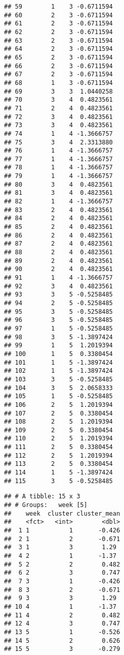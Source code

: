 \documentclass[]{article}
\newenvironment{Shaded}{\begin{snugshade}}{\end{snugshade}}
\newcommand{\DataTypeTok}[1]{\textcolor[rgb]{0.13,0.29,0.53}{#1}}
\newcommand{\KeywordTok}[1]{\textcolor[rgb]{0.13,0.29,0.53}{\textbf{#1}}}
\newcommand{\NormalTok}[1]{#1}
\newcommand{\OperatorTok}[1]{\textcolor[rgb]{0.81,0.36,0.00}{\textbf{#1}}}
\newcommand{\StringTok}[1]{\textcolor[rgb]{0.31,0.60,0.02}{#1}}
\begin{document}
\begin{verbatim}
## 59        1    3 -0.6711594
## 60        2    3 -0.6711594
## 61        2    3 -0.6711594
## 62        2    3 -0.6711594
## 63        2    3 -0.6711594
## 64        2    3 -0.6711594
## 65        2    3 -0.6711594
## 66        2    3 -0.6711594
## 67        2    3 -0.6711594
## 68        1    3 -0.6711594
## 69        3    3  1.0440258
## 70        3    4  0.4823561
## 71        2    4  0.4823561
## 72        3    4  0.4823561
## 73        3    4  0.4823561
## 74        1    4 -1.3666757
## 75        3    4  2.3313880
## 76        1    4 -1.3666757
## 77        1    4 -1.3666757
## 78        1    4 -1.3666757
## 79        1    4 -1.3666757
## 80        3    4  0.4823561
## 81        3    4  0.4823561
## 82        1    4 -1.3666757
## 83        2    4  0.4823561
## 84        2    4  0.4823561
## 85        2    4  0.4823561
## 86        2    4  0.4823561
## 87        2    4  0.4823561
## 88        2    4  0.4823561
## 89        2    4  0.4823561
## 90        2    4  0.4823561
## 91        1    4 -1.3666757
## 92        3    4  0.4823561
## 93        3    5 -0.5258485
## 94        2    5 -0.5258485
## 95        3    5 -0.5258485
## 96        3    5 -0.5258485
## 97        1    5 -0.5258485
## 98        3    5 -1.3897424
## 99        1    5  1.2019394
## 100       1    5  0.3380454
## 101       1    5 -1.3897424
## 102       1    5 -1.3897424
## 103       3    5 -0.5258485
## 104       3    5  2.0658333
## 105       1    5 -0.5258485
## 106       2    5  1.2019394
## 107       2    5  0.3380454
## 108       2    5  1.2019394
## 109       2    5  0.3380454
## 110       2    5  1.2019394
## 111       2    5  0.3380454
## 112       2    5  1.2019394
## 113       2    5  0.3380454
## 114       1    5 -1.3897424
## 115       3    5 -0.5258485
\end{verbatim}

\begin{Shaded}
\end{Shaded}

\begin{verbatim}
## # A tibble: 15 x 3
## # Groups:   week [5]
##    week  cluster cluster_mean
##    <fct>   <int>        <dbl>
##  1 1           1       -0.426
##  2 1           2       -0.671
##  3 1           3        1.29 
##  4 2           1       -1.37 
##  5 2           2        0.482
##  6 2           3        0.747
##  7 3           1       -0.426
##  8 3           2       -0.671
##  9 3           3        1.29 
## 10 4           1       -1.37 
## 11 4           2        0.482
## 12 4           3        0.747
## 13 5           1       -0.526
## 14 5           2        0.626
## 15 5           3       -0.279
\end{verbatim}
\end{document}

